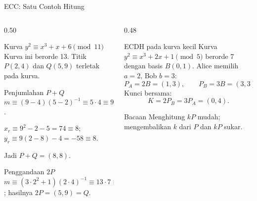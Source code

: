 \documentclass[aspectratio=169,11pt]{beamer}
\begin{document}
\begin{frame}{ECC: Satu Contoh Hitung}
    \scriptsize
    \begin{columns}[T,onlytextwidth]
        \begin{column}{0.50\textwidth}
            \begin{block}{Kurva $y^{2}\equiv x^{3}+x+6 \pmod{11}$}
                Kurva ini berorde 13. Titik $P(2,4)$ dan $Q(5,9)$ terletak
                pada kurva.
            \end{block}
            \begin{exampleblock}{Penjumlahan $P+Q$}
                $m \equiv (9-4)(5-2)^{-1} \equiv 5\cdot4 \equiv 9 \pmod{11}$.
                \par\vspace{1pt}
                $x_r \equiv 9^{2}-2-5=74\equiv8$;
                $y_r \equiv 9(2-8)-4=-58\equiv8$.
                \par\vspace{1pt}
                Jadi $P+Q=(8,8)$.
            \end{exampleblock}
            \begin{exampleblock}{Penggandaan $2P$}
                $m \equiv (3\cdot2^{2}+1)(2\cdot4)^{-1}\equiv13\cdot7\equiv3$;
                hasilnya $2P=(5,9)=Q$.
            \end{exampleblock}
        \end{column}
        \begin{column}{0.48\textwidth}
            \begin{block}{ECDH pada kurva kecil}
                Kurva $y^{2}\equiv x^{3}+2x+1\pmod5$ berorde 7 dengan basis
                $B(0,1)$. Alice memilih $a=2$, Bob $b=3$:
                \[
                    P_A=2B=(1,3), \qquad P_B=3B=(3,3).
                \]
                Kunci bersama:
                \[
                    K=2P_B=3P_A=(0,4).
                \]
            \end{block}
            \begin{alertblock}{Bacaan}
                \footnotesize
                Menghitung $kP$ mudah; mengembalikan $k$ dari $P$ dan $kP$
                sukar.
            \end{alertblock}
        \end{column}
    \end{columns}
\end{frame}
\end{document}
